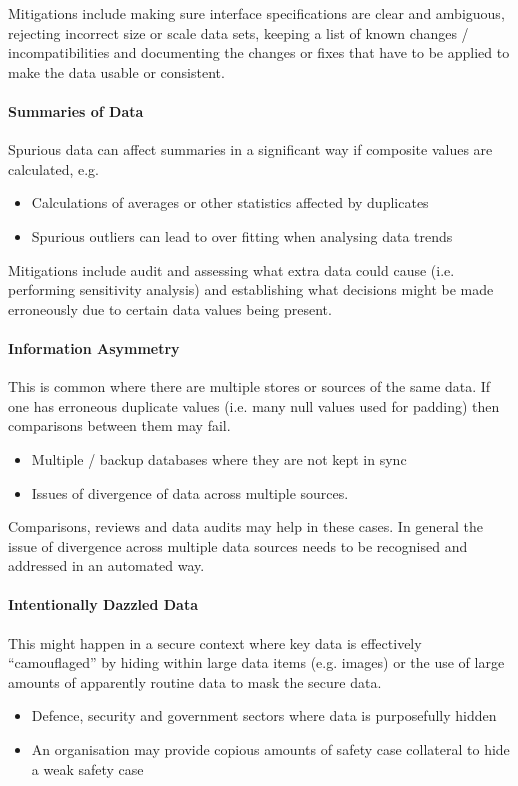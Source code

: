 Mitigations include making sure interface specifications are clear and ambiguous, rejecting incorrect size or scale data sets, keeping a list of known changes / incompatibilities and documenting the changes or fixes that have to be applied to make the data usable or consistent.

\paragraph{Summaries of Data}
Spurious data can affect summaries in a significant way if composite values are calculated, e.g.
\begin{itemize}
    \item Calculations of averages or other statistics affected by duplicates
    \item Spurious outliers can lead to over fitting when analysing data trends
\end{itemize}

Mitigations include audit and assessing what extra data could cause (i.e. performing sensitivity analysis) and establishing what decisions might be made erroneously due to certain data values being present.	

\paragraph{Information Asymmetry}
This is common where there are multiple stores or sources of the same data. If one has erroneous duplicate values (i.e. many null values used for padding) then comparisons between them may fail.
\begin{itemize}
    \item Multiple / backup databases where they are not kept in sync
    \item Issues of divergence of data across multiple sources.
\end{itemize}

Comparisons, reviews and data audits may help in these cases. In general the issue of divergence across multiple data sources needs to be recognised and addressed in an automated way.

\paragraph{Intentionally Dazzled Data}
This might happen in a secure context where key data is effectively ``camouflaged'' by hiding within large data items (e.g. images) or the use of large amounts of apparently routine data to mask the secure data.
\begin{itemize}
    \item Defence, security and government sectors where data is purposefully hidden 
    \item An organisation may provide copious amounts of safety case collateral to hide a weak safety case
\end{itemize}
